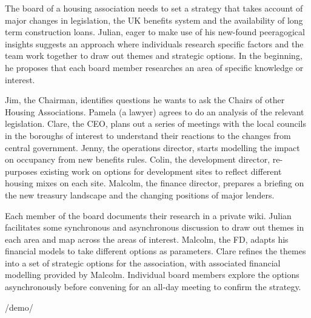 The board of a housing association needs to set a strategy that takes
account of major changes in legislation, the UK benefits system and the
availability of long term construction loans. Julian, eager to make use
of his new-found peeragogical insights suggests an approach where
individuals research specific factors and the team work together to draw
out themes and strategic options. In the beginning, he proposes that
each board member researches an area of specific knowledge or interest.

Jim, the Chairman, identifies questions he wants to ask the Chairs of
other Housing Associations. Pamela (a lawyer) agrees to do an analysis
of the relevant legislation. Clare, the CEO, plans out a series of
meetings with the local councils in the boroughs of interest to
understand their reactions to the changes from central government.
Jenny, the operations director, starts modelling the impact on occupancy
from new benefits rules. Colin, the development director, re-purposes
existing work on options for development sites to reflect different
housing mixes on each site. Malcolm, the finance director, prepares a
briefing on the new treasury landscape and the changing positions of
major lenders.

Each member of the board documents their research in a private wiki.
Julian facilitates some synchronous and asynchronous discussion to draw
out themes in each area and map across the areas of interest. Malcolm,
the FD, adapts his financial models to take different options as
parameters. Clare refines the themes into a set of strategic options for
the association, with associated financial modelling provided by
Malcolm. Individual board members explore the options asynchronously
before convening for an all-day meeting to confirm the strategy.

/demo/
